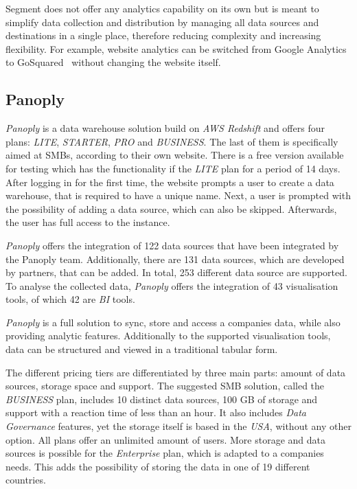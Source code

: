 \documentclass[../paper.tex]{subfiles}
\begin{document}
Segment does not offer any analytics capability on its own but is meant to simplify data collection and distribution by managing all data sources and destinations in a single place, therefore reducing complexity and increasing flexibility. For example, website analytics can be switched from Google Analytics~\cite{google_analytics} to GoSquared~\cite{gosquared} without changing the website itself.

\subsection{Panoply}

\textit{Panoply} is a data warehouse solution build on \textit{AWS Redshift} and offers four plans: \textit{LITE}, \textit{STARTER}, \textit{PRO} and \textit{BUSINESS}. The last of them is specifically aimed at SMBs, according to their own website. There is a free version available for testing which has the functionality if the \textit{LITE} plan for a period of 14 days. After logging in for the first time, the website prompts a user to create a data warehouse, that is required to have a unique name. Next, a user is prompted with the possibility of adding a data source, which can also be skipped. Afterwards, the user has full access to the instance.

\textit{Panoply} offers the integration of 122 data sources that have been integrated by the Panoply team. Additionally, there are 131 data sources, which are developed by partners, that can be added. In total, 253 different data source are supported. To analyse the collected data, \textit{Panoply} offers the integration of 43 visualisation tools, of which 42 are \textit{BI} tools.

\textit{Panoply} is a full solution to sync, store and access a companies data, while also providing analytic features. Additionally to the supported visualisation tools, data can be structured and viewed in a traditional tabular form.

The different pricing tiers are differentiated by three main parts: amount of data sources, storage space and support. The suggested SMB solution, called the \textit{BUSINESS} plan, includes 10 distinct data sources, 100 GB of storage and support with a reaction time of less than an hour. It also includes \textit{Data Governance} features, yet the storage itself is based in the \textit{USA}, without any other option. All plans offer an unlimited amount of users. More storage and data sources is possible for the \textit{Enterprise} plan, which is adapted to a companies needs. This adds the possibility of storing the data in one of 19 different countries.
\end{document}
